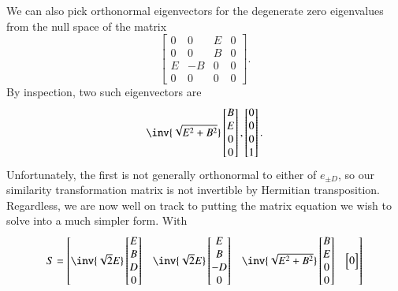 {%
We can also pick orthonormal eigenvectors for the degenerate zero eigenvalues from the null space of the matrix
%
\begin{equation}\label{eqn:relElectroDynProblemSet2:670}
\begin{bmatrix}
0 & 0 & E & 0 \\
0 & 0 & B & 0 \\
E & -B & 0 & 0 \\
0 & 0 & 0 & 0
\end{bmatrix}.
\end{equation}
By inspection, two such eigenvectors are
\begin{equation}\label{eqn:relElectroDynProblemSet2:690}
\inv{\sqrt{E^2 + B^2}}
\begin{bmatrix}
B \\
E \\
0 \\
0
\end{bmatrix},
\begin{bmatrix}
0 \\
0 \\
0 \\
1
\end{bmatrix}.
\end{equation}
%
Unfortunately, the first is not generally orthonormal to either of \(e_{\pm D}\), so our similarity transformation matrix is not invertible by Hermitian transposition.  Regardless, we are now well on track to putting the matrix equation we wish to solve into a much simpler form.  With
%
\begin{equation}\label{eqn:relElectroDynProblemSet2:710}
S =
\begin{bmatrix}
\inv{\sqrt{2}E}
\begin{bmatrix}
E \\
B \\
D \\
0
\end{bmatrix}
&
\inv{\sqrt{2}E}
\begin{bmatrix}
E \\
B \\
-D \\
0
\end{bmatrix} &
\inv{\sqrt{E^2 + B^2}}
\begin{bmatrix}
B \\
E \\
0 \\
0
\end{bmatrix} &
\begin{bmatrix}
0 \\

\end{bmatrix}
\end{bmatrix}
\end{equation}}
